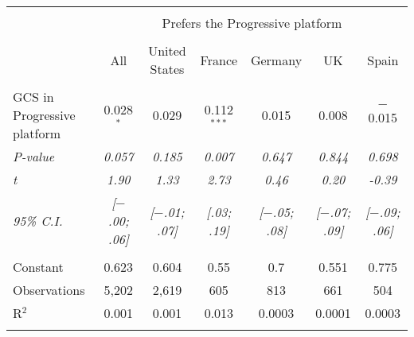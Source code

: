 
\begin{tabular}{@{\extracolsep{5pt}}lcccccc} 
\\[-1.8ex]\hline 
\hline \\[-1.8ex] 
 & \multicolumn{6}{c}{Prefers the Progressive platform} \\ 
\cline{2-7} 
\\[-1.8ex] & All & United States & France & Germany & UK & Spain \\ 
\hline \\[-1.8ex] 
 GCS in Progressive platform & 0.028$^{*}$ & 0.029 & 0.112$^{***}$ & 0.015 & 0.008 & $-$0.015 \\ 
 \textit{P-value} & \textit{0.057} & \textit{0.185} & \textit{0.007} & \textit{0.647} & \textit{0.844} & \textit{0.698} \\
 \textit{t} & \textit{1.90} & \textit{1.33} & \textit{2.73} & \textit{0.46} & \textit{0.20} & \textit{-0.39} \\
 \textit{95\% C.I.} & \textit{[$-$.00; .06]} & \textit{[$-$.01; .07]} & \textit{[.03; .19]} & \textit{[$-$.05; .08]} & \textit{[$-$.07; .09]} & \textit{[$-$.09; .06]} \\ 
 \hline \\[-1.8ex] 
Constant & 0.623 & 0.604 & 0.55 & 0.7 & 0.551 & 0.775 \\ 
Observations & 5,202 & 2,619 & 605 & 813 & 661 & 504 \\ 
R$^{2}$ & 0.001 & 0.001 & 0.013 & 0.0003 & 0.0001 & 0.0003 \\ 
\hline 
\hline \\[-1.8ex] 
\end{tabular} 